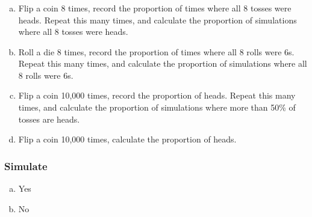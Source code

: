 
\begin{frame}
\frametitle{}


\begin{enumerate}[(a)]
\item Flip a coin 8 times, record the proportion of times where all 8 tosses were heads. Repeat this many times, and calculate the proportion of simulations where all 8 tosses were heads.
\item Roll a die 8 times, record the proportion of times where all 8 rolls were 6s. Repeat this many times, and calculate the proportion of simulations where all 8 rolls were 6s.
\item Flip a coin 10,000 times, record the proportion of heads. Repeat this many times, and calculate the proportion of simulations where more than 50\% of tosses are heads.
\item Flip a coin 10,000 times, calculate the proportion of heads.
\end{enumerate}

\end{frame}


\begin{frame}
\frametitle{Simulate}


\begin{enumerate}[(a)]
\item Yes
\item No
\end{enumerate}

\end{frame}


